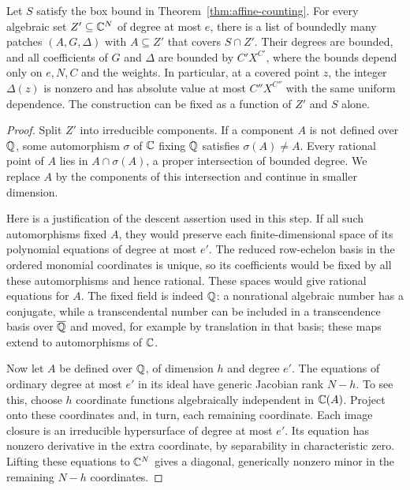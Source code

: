 \begin{lemma}\label{lem:affine-patches}
Let $S$ satisfy the box bound in Theorem~\ref{thm:affine-counting}.
For every algebraic set $Z'\subseteq\mathbb C^N$ of degree at most $e$, there
is a list of boundedly many patches $(A,G,\Delta)$ with $A\subseteq Z'$
that covers $S\cap Z'$.  Their degrees are bounded, and all coefficients
of $G$ and $\Delta$ are bounded by $C'X^{C'}$, where the bounds depend
only on $e,N,C$ and the weights.  In particular, at a covered point
$z$, the integer $\Delta(z)$ is nonzero and has absolute value at most
$C''X^{C''}$ with the same uniform dependence.
The construction can be fixed as a function of $Z'$ and $S$ alone.
\end{lemma}

\begin{proof}
Split $Z'$ into irreducible components.  If a component $A$ is not
defined over $\mathbb Q$, some automorphism $\sigma$ of $\mathbb C$ fixing $\mathbb Q$
satisfies $\sigma(A)\ne A$.  Every rational point of $A$ lies in
$A\cap\sigma(A)$, a proper intersection of bounded degree.  We replace
$A$ by the components of this intersection and continue in smaller
dimension.

Here is a justification of the descent assertion used in this step.
If all such automorphisms fixed $A$, they would preserve each
finite-dimensional space of its polynomial equations of degree at
most $e'$.  The reduced row-echelon basis in the ordered monomial
coordinates is unique, so its coefficients would be fixed by all these
automorphisms and hence rational.  These spaces would give rational
equations for $A$.  The fixed field is indeed $\mathbb Q$: a nonrational
algebraic number has a conjugate, while a transcendental number can be
included in a transcendence basis over $\overline{\mathbb Q}$ and moved, for
example by translation in that basis; these maps extend to
automorphisms of $\mathbb C$.

Now let $A$ be defined over $\mathbb Q$, of dimension $h$ and degree $e'$.
The equations of ordinary degree at most $e'$ in its ideal have generic
Jacobian rank $N-h$.  To see this, choose $h$ coordinate functions
algebraically independent in $\mathbb C(A)$.  Project onto these coordinates
and, in turn, each remaining coordinate.  Each image closure is an
irreducible hypersurface of degree at most $e'$.  Its equation has
nonzero derivative in the extra coordinate, by separability in
characteristic zero.  Lifting these equations to $\mathbb C^N$ gives a
diagonal, generically nonzero minor in the remaining $N-h$ coordinates.


\end{proof}
